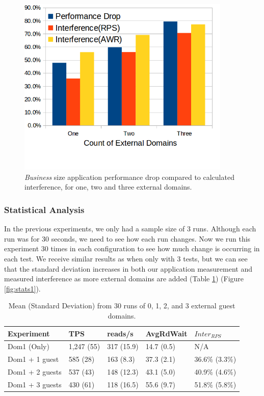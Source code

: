 \begin{figure}[!h]
  \begin{center}
  \includegraphics[width=4in]{images/Dell_PerfDrop_Int.png}
  \caption{\emph{Business} size application performance drop compared to calculated interference, for one, two and three external domains.}
  \label{fig:perfDropDell}
  \end{center}
\end{figure}

\subsubsection{Statistical Analysis}
In the previous experiments, we only had a sample size of 3 runs.  Although each run was for 30 seconds, we need to see how each run changes.  Now we run this experiment 30 times in each configuration to see how much change is occurring in each test.  We receive similar results as when only with 3 tests, but we can see that the standard deviation increases in both our application measurement and measured interference as more external domains are added (Table \ref{tab:stats}) (Figure \ref{fig:stats1}).

\begin{table}[!h]
\begin{tabular}{ l l l l p{3cm} }
	Experiment  & TPS        & reads/s  & AvgRdWait   & $Inter_{RPS}$ \\ 
	\hline
    Dom1 (Only)     &1,247 (55)  & 317 (15.9) & 14.7 (0.5)  &  N/A   \\
    Dom1 + 1 guest  & 585 (28)   & 163 (8.3)  & 37.3 (2.1)  & 36.6\% (3.3\%)  \\
    Dom1 + 2 guests & 537 (43)   & 148 (12.3) & 43.1 (5.0)  & 40.9\% (4.6\%) \\
    Dom1 + 3 guests & 430 (61)   & 118 (16.5) & 55.6 (9.7)  & 51.8\% (5.8\%) \\
\end{tabular}
\caption{Mean (Standard Deviation) from 30 runs of 0, 1, 2, and 3 external guest domains.}
\label{tab:stats}
\end{table}

